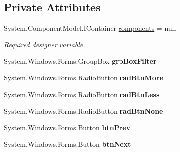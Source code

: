 \subsection*{Private Attributes}
\begin{DoxyCompactItemize}
\item 
System.\-Component\-Model.\-I\-Container \hyperlink{class_price_comparison_form_1_1_form_price_compare_aae6e78edce142e17ecf15f769bd2ba21}{components} = null
\begin{DoxyCompactList}\small\item\em Required designer variable. \end{DoxyCompactList}\item 
\hypertarget{class_price_comparison_form_1_1_form_price_compare_ab759c66655f84b941c0df88e209f9656}{System.\-Windows.\-Forms.\-Group\-Box {\bfseries grp\-Box\-Filter}}\label{class_price_comparison_form_1_1_form_price_compare_ab759c66655f84b941c0df88e209f9656}

\item 
\hypertarget{class_price_comparison_form_1_1_form_price_compare_a3c9d759e4b063e0a501b521e6283165e}{System.\-Windows.\-Forms.\-Radio\-Button {\bfseries rad\-Btn\-More}}\label{class_price_comparison_form_1_1_form_price_compare_a3c9d759e4b063e0a501b521e6283165e}

\item 
\hypertarget{class_price_comparison_form_1_1_form_price_compare_a801977cfede81a41eafbc67af550bf72}{System.\-Windows.\-Forms.\-Radio\-Button {\bfseries rad\-Btn\-Less}}\label{class_price_comparison_form_1_1_form_price_compare_a801977cfede81a41eafbc67af550bf72}

\item 
\hypertarget{class_price_comparison_form_1_1_form_price_compare_a93ae7abdb9a332fd2e911044cbc9a8e2}{System.\-Windows.\-Forms.\-Radio\-Button {\bfseries rad\-Btn\-None}}\label{class_price_comparison_form_1_1_form_price_compare_a93ae7abdb9a332fd2e911044cbc9a8e2}

\item 
\hypertarget{class_price_comparison_form_1_1_form_price_compare_acb24c2c4a237354b941c19cf4f7c8ac3}{System.\-Windows.\-Forms.\-Button {\bfseries btn\-Prev}}\label{class_price_comparison_form_1_1_form_price_compare_acb24c2c4a237354b941c19cf4f7c8ac3}

\item 
\hypertarget{class_price_comparison_form_1_1_form_price_compare_a632dee63320b6452fef18fd86a00e6c0}{System.\-Windows.\-Forms.\-Button {\bfseries btn\-Next}}\label{class_price_comparison_form_1_1_form_price_compare_a632dee63320b6452fef18fd86a00e6c0}


\end{DoxyCompactItemize}
